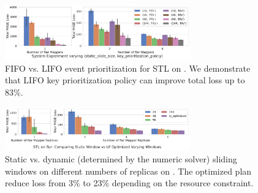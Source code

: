 \begin{figure}[t]
\setlength{\belowcaptionskip}{-5pt}
\begin{center}
\includegraphics[width=8cm]{ralf/figures/STL_ralf_event_prioritization.pdf}
\centering
\end{center}
\caption{FIFO vs. LIFO event prioritization for STL on \system{}. We demonstrate that LIFO key prioritization policy can improve total loss up to 83\%. }
    \label{f:stl-real-event-ralf}
\end{figure}

\begin{figure}[t]
\begin{center}
\includegraphics[width=8cm]{ralf/figures/real_stl.pdf}

\centering
\end{center}

\caption{ Static vs. dynamic (determined by the numeric solver) sliding windows on different numbers of replicas on \system{}. The optimized plan reduce loss from 3\% to 23\% depending on the resource constraint.}
    \label{f:stl-real-ralf}
\end{figure}





